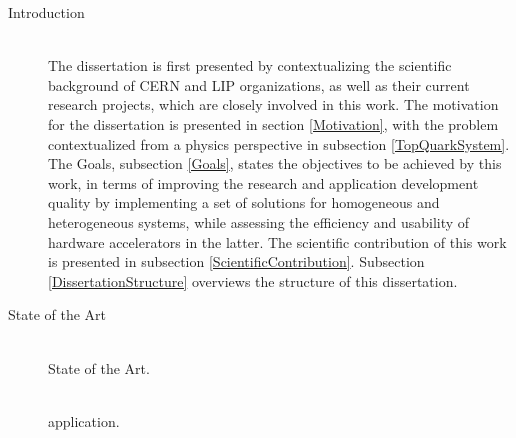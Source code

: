 \begin{description}
	\item[Introduction] \hfill \\
	The dissertation is first presented by contextualizing the scientific background of CERN and LIP organizations, as well as their current research projects, which are closely involved in this work. The motivation for the dissertation is presented in section \ref{Motivation}, with the problem contextualized from a physics perspective in subsection \ref{TopQuarkSystem}. The Goals, subsection \ref{Goals}, states the objectives to be achieved by this work, in terms of improving the research and application development quality by implementing a set of solutions for homogeneous and heterogeneous systems, while assessing the efficiency and usability of hardware accelerators in the latter. The scientific contribution of this work is presented in subsection \ref{ScientificContribution}. Subsection \ref{DissertationStructure} overviews the structure of this dissertation.
	\item[State of the Art] \hfill \\
	State of the Art.
	\item[\tth] \hfill \\
	\tth application.
\end{description}
